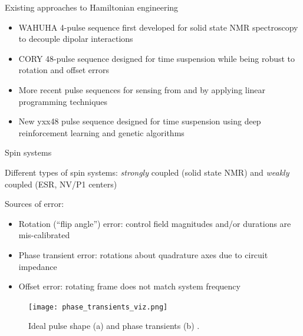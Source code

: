 \documentclass{beamer}
\begin{document}
\begin{frame}{Existing approaches to Hamiltonian engineering}

\begin{itemize}
    \item WAHUHA 4-pulse sequence first developed for solid state NMR spectroscopy to decouple dipolar interactions \cite{PhysRevLett.20.180}
    
    \item CORY 48-pulse sequence designed for time suspension while being robust to rotation and offset errors
    
    \item More recent pulse sequences for sensing from \cite{O_Keeffe_2019} and \cite{PhysRevLett.119.183603} by applying linear programming techniques
    
    \item New yxx48 pulse sequence designed for time suspension using deep reinforcement learning and genetic algorithms \cite{peng2021deep}
\end{itemize}

\end{frame}

\begin{frame}{Spin systems}

Different types of spin systems: \emph{strongly} coupled (solid state NMR) and \emph{weakly} coupled (ESR, NV/P1 centers)

Sources of error:
\begin{itemize}
    \item Rotation (``flip angle'') error: control field magnitudes and/or durations are mis-calibrated
    \item Phase transient error: rotations about quadrature axes due to circuit impedance
    \item Offset error: rotating frame does not match system frequency
\end{itemize}

\begin{figure}
\centering
\texttt{[image: phase\_transients\_viz.png]}
\caption{Ideal pulse shape (a) and phase transients (b) \cite{1976ii}.}
\end{figure}

\end{frame}
\end{document}

